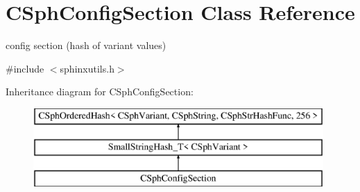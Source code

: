 \hypertarget{classCSphConfigSection}{\section{C\-Sph\-Config\-Section Class Reference}
\label{classCSphConfigSection}
}


config section (hash of variant values)  




{\ttfamily \#include $<$sphinxutils.\-h$>$}

Inheritance diagram for C\-Sph\-Config\-Section\-:\begin{figure}[H]
\begin{center}
\leavevmode
\includegraphics[height=3.000000cm]{classCSphConfigSection}
\end{center}
\end{figure}
